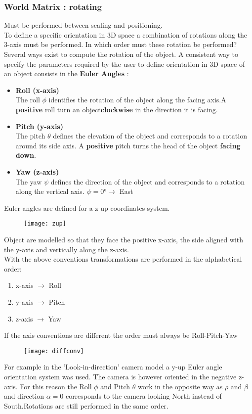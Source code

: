 \subsubsection{World Matrix : rotating}
Must be performed between scaling and positioning.\\
To define a specific orientation in 3D space a combination of rotations along the 3-axis must be performed. In which order must these rotation be performed?\\
Several ways exist to compute the rotation of the object. A consistent way to specify the parameters required by the user to define orientation in 3D space of an object consists in the \textbf{Euler Angles} :
\begin{itemize}
\item \textbf{ Roll (x-axis)}\\
The roll $ \phi$ identifies the rotation of the object along the facing axis.A \textbf{positive} roll turn an object\textbf{clockwise} in the direction it is facing.
\item \textbf{Pitch (y-axis)}\\
The pitch $\theta$ defines the elevation of the object and corresponds to a rotation around its side axis. A \textbf{positive} pitch turns the head of the object \textbf{facing down}.
\item \textbf{ Yaw (z-axis)}\\
The yaw $\psi$ defines the direction of the object and corresponds to a rotation along the vertical axis. $\psi = \ang{0} \to$ East
\end{itemize}
Euler angles are defined for a z-up coordinates system.
\begin{figure}[H]
  \centering
  \texttt{[image: zup]}
\end{figure}
Object are modelled so that they face the positive x-axis, the side aligned with the y-axis and vertically along the z-axis.\\ 
With the above conventions transformations are performed in the alphabetical order:
\begin{enumerate}
\item x-axis $\to$ Roll
\item y-axis $\to$ Pitch
\item z-axis $\to$ Yaw
\end{enumerate}
If the axis conventions are different the order must always be Roll-Pitch-Yaw
\begin{figure}[H]
  \centering
  \texttt{[image: diffconv]}
\end{figure}
For example in the 'Look-in-direction' camera model a y-up Euler angle orientation system was used. The camera is however oriented in the negative z-axis. For this reason the Roll $\phi$ and Pitch $\theta$ work in the opposite way as $\rho$ and $\beta$ and direction $ \alpha = 0$ corresponds to the camera looking North instead of South.Rotations are still performed in the same order.


